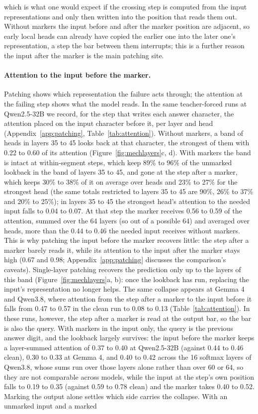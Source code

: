 \documentclass[10pt]{article} %
\begin{document}
which is what one would expect if the crossing step is computed from the input representations and only then written into the position that reads them out. Without markers the input before and after the marker position are adjacent, so early local heads can already have copied the earlier one into the later one's representation, a step the bar between them interrupts; this is a further reason the input after the marker is the main patching site.

\paragraph{Attention to the input before the marker.} Patching shows which representation the failure acts through; the attention at the failing step shows what the model reads. In the same teacher-forced runs at Qwen2.5-32B we record, for the step that writes each answer character, the attention placed on the input character before it, per layer and head (Appendix~\ref{app:patching}, Table~\ref{tab:attention}). Without markers, a band of heads in layers 35 to 45 looks back at that character, the strongest of them with 0.22 to 0.60 of its attention (Figure~\ref{fig:mechlayers}c, d). With markers the band is intact at within-segment steps, which keep 89\% to 96\% of the unmarked lookback in the band of layers 35 to 45, and gone at the step after a marker, which keeps 30\% to 38\% of it on average over heads and 23\% to 27\% for the strongest head (the same totals restricted to layers 35 to 45 are 90\%, 26\% to 37\% and 20\% to 25\%); in layers 35 to 45 the strongest head's attention to the needed input falls to 0.04 to 0.07. At that step the marker receives 0.56 to 0.59 of the attention, summed over the 64 layers (so out of a possible 64) and averaged over heads, more than the 0.44 to 0.46 the needed input receives without markers. This is why patching the input before the marker recovers little: the step after a marker barely reads it, while its attention to the input after the marker stays high (0.67 and 0.98; Appendix~\ref{app:patching} discusses the comparison's caveats). Single-layer patching recovers the prediction only up to the layers of this band (Figure~\ref{fig:mechlayers}a, b): once the lookback has run, replacing the input's representation no longer helps. The same collapse appears at Gemma 4 and Qwen3.8, where attention from the step after a marker to the input before it falls from 0.47 to 0.57 in the clean run to 0.08 to 0.13 (Table~\ref{tab:attention}). In these runs, however, the step after a marker is read at the output bar, so the bar is also the query. With markers in the input only, the query is the previous answer digit, and the lookback largely survives: the input before the marker keeps a layer-summed attention of 0.37 to 0.40 at Qwen2.5-32B (against 0.44 to 0.46 clean), 0.30 to 0.33 at Gemma 4, and 0.40 to 0.42 across the 16 softmax layers of Qwen3.8, whose sums run over those layers alone rather than over 60 or 64, so they are not comparable across models, while the input at the step's own position falls to 0.19 to 0.35 (against 0.59 to 0.78 clean) and the marker takes 0.40 to 0.52. Marking the output alone settles which side carries the collapse. With an unmarked input and a marked 
\end{document}
